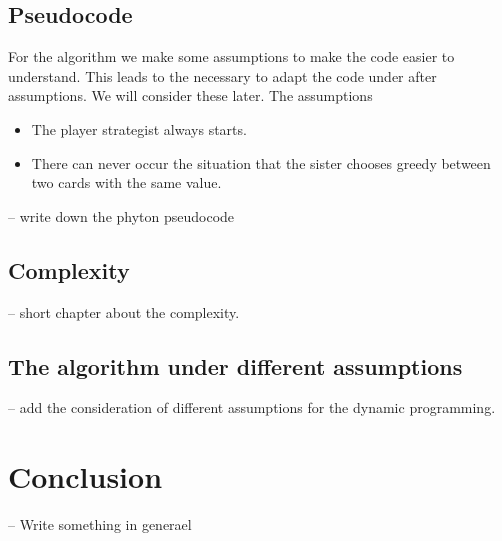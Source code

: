 \documentclass[parskip=full]{scrartcl}
\begin{document}
\subsection{Pseudocode}
For the algorithm we make some assumptions to make the code
easier to understand. This leads to the necessary to adapt
the code under after assumptions. We will consider these later.
The assumptions
\begin{itemize}
	\item The player strategist always starts.
	\item There can never occur the situation that the sister chooses greedy between two cards with the same value.
\end{itemize}

-- write down the phyton pseudocode



\subsection{Complexity}
-- short chapter about the complexity.

\subsection{The algorithm under different assumptions}
-- add the consideration of different assumptions for the dynamic programming.


\section{Conclusion}
-- Write something in generael

\clearpage

\printglossaries
\end{document}
